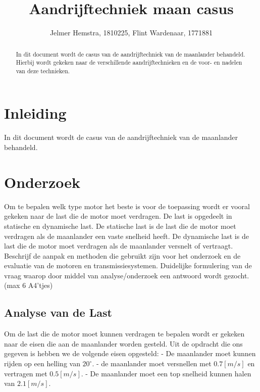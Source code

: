 \documentclass{article}
\title{Aandrijftechniek maan casus}
\author{Jelmer Hemstra, 1810225, Flint Wardenaar, 1771881}
\begin{document}
\maketitle

\begin{abstract}
    In dit document wordt de casus van de aandrijftechniek van de maanlander behandeld. Hierbij wordt gekeken naar de verschillende aandrijftechnieken en de voor- en nadelen van deze technieken.
\end{abstract}


\section{Inleiding}
    In dit document wordt de casus van de aandrijftechniek van de maanlander behandeld. 


\section{Onderzoek}


    Om te bepalen welk type motor het beste is voor de toepassing wordt er vooral gekeken naar de last die de motor moet verdragen.
    De last is opgedeelt in statische en dynamische last. 
    De statische last is de last die de motor moet verdragen als de maanlander een vaste snelheid heeft.
    De dynamische last is de last die de motor moet verdragen als de maanlander versnelt of vertraagt.
    \newline
    Beschrijf de aanpak en methoden die gebruikt zijn voor het onderzoek en de evaluatie van de motoren en transmissiesystemen.
    Duidelijke formulering van de vraag waarop
    door middel van analyse/onderzoek een
    antwoord wordt gezocht. (max 6 A4’tjes)




\subsection{Analyse van de Last}
    Om de last die de motor moet kunnen verdragen te bepalen wordt er gekeken naar de eisen die aan de maanlander worden gesteld.
    Uit de opdracht die ons gegeven is hebben we de volgende eisen opgesteld:\newline
    - De maanlander moet kunnen rijden op een helling van $20^{\circ}$. \newline
    - de maanlander moet versnellen met $0.7[m/s]$ en vertragen met $0.5[m/s]$. \newline
    - De maanlander moet een top snelheid kunnen halen van $2.1[m/s]$. \newline
\end{document}
